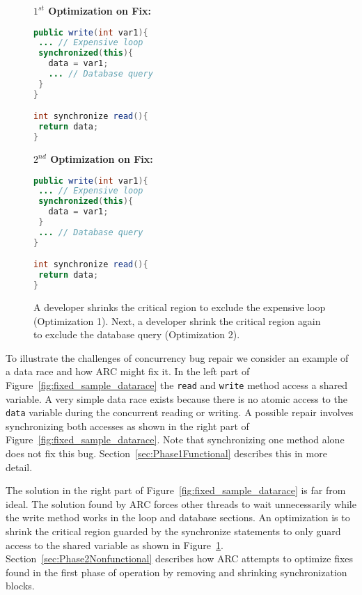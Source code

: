 \documentclass{llncs}
\begin{document}
\begin{figure}[t!]
\begin{minipage}{5cm}
\footnotesize{\textbf{$1^{st}$ Optimization on Fix:}}
\begin{lstlisting}[language=Java, morekeywords={synchronize}]
public write(int var1){
 ... // Expensive loop
 synchronized(this){
   data = var1;
   ... // Database query
 }
}

int synchronize read(){
 return data;
}
\end{lstlisting}
\end{minipage}\hfill
\begin{minipage}{5cm}
\footnotesize{\textbf{$2^{nd}$ Optimization on Fix:}}
\begin{lstlisting}[language=Java, morekeywords={synchronize}]
public write(int var1){
 ... // Expensive loop
 synchronized(this){
   data = var1;
 }
 ... // Database query
}

int synchronize read(){
 return data;
}
\end{lstlisting}
\end{minipage}
\caption{A developer shrinks the critical region to exclude the expensive loop (Optimization 1). Next, a developer shrink the critical region again to exclude the database query (Optimization 2).}
\label{fig:optimized_sample_datarace}
\end{figure}


To illustrate the challenges of concurrency bug repair we consider an example of a data race and how ARC might fix it. In the left part of Figure~\ref{fig:fixed_sample_datarace} the \texttt{read} and \texttt{write} method access a shared variable. A very simple data race exists because there is no atomic access to the \texttt{data} variable during the concurrent reading or writing. A possible repair involves synchronizing both accesses as shown in the right part of Figure~\ref{fig:fixed_sample_datarace}. Note that synchronizing one method alone does not fix this bug. Section~\ref{sec:Phase1Functional} describes this in more detail.

The solution in the right part of Figure~\ref{fig:fixed_sample_datarace} is far from ideal. The solution found by ARC forces other threads to wait unnecessarily while the write method works in the loop and database sections. An optimization is to shrink the critical region guarded by the synchronize statements to only guard access to the shared variable as shown in Figure~\ref{fig:optimized_sample_datarace}.  Section~\ref{sec:Phase2Nonfunctional} describes how ARC attempts to optimize fixes found in the first phase of operation by removing and shrinking synchronization blocks. 
\end{document}
